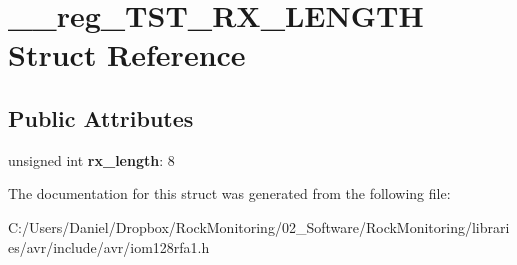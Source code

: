 \hypertarget{struct____reg___t_s_t___r_x___l_e_n_g_t_h}{}\section{\+\_\+\+\_\+reg\+\_\+\+T\+S\+T\+\_\+\+R\+X\+\_\+\+L\+E\+N\+G\+TH Struct Reference}
\label{struct____reg___t_s_t___r_x___l_e_n_g_t_h}
\subsection*{Public Attributes}
\begin{DoxyCompactItemize}
\item 
unsigned int {\bfseries rx\+\_\+length}\+: 8\hypertarget{struct____reg___t_s_t___r_x___l_e_n_g_t_h_a93d67db5f2a7d8851b3a93bdb62208a3}{}\label{struct____reg___t_s_t___r_x___l_e_n_g_t_h_a93d67db5f2a7d8851b3a93bdb62208a3}

\end{DoxyCompactItemize}


The documentation for this struct was generated from the following file\+:\begin{DoxyCompactItemize}
\item 
C\+:/\+Users/\+Daniel/\+Dropbox/\+Rock\+Monitoring/02\+\_\+\+Software/\+Rock\+Monitoring/libraries/avr/include/avr/iom128rfa1.\+h\end{DoxyCompactItemize}
